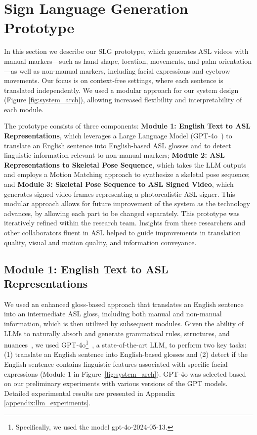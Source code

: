 \section{Sign Language Generation Prototype}\label{sec:design} 

In this section we describe our SLG prototype, which generates ASL videos with manual markers---such as hand shape, location, movements, and palm orientation---as well as non-manual markers, including facial expressions and eyebrow movements. 
Our focus is on context-free settings, where each sentence is translated independently. We used a modular approach for our system design (Figure \ref{fig:system_arch}), allowing increased flexibility and interpretability of each module.

The prototype consists of three components: \textbf{Module 1: English Text to ASL Representations}, which leverages a Large Language Model (GPT-4o~\cite{achiam2023gpt}) to translate an English sentence into English-based ASL glosses and to detect linguistic information relevant to non-manual markers; \textbf{Module 2: ASL Representations to Skeletal Pose Sequence}, which takes the LLM outputs and employs a Motion Matching approach to synthesize a skeletal pose sequence; and \textbf{Module 3: Skeletal Pose Sequence to ASL Signed Video}, which generates signed video frames representing a photorealistic ASL signer. 
This modular approach allows for future improvement of the system as the technology advances, by allowing each part to be changed separately. This prototype was iteratively refined within the research team. Insights from these researchers and other collaborators fluent in ASL helped to guide improvements in translation quality, visual and motion quality, and information conveyance.



\subsection{Module 1: English Text to ASL Representations}\label{sebsec:module1}

We used an enhanced gloss-based approach that translates an English sentence into an intermediate ASL gloss, including both manual and non-manual information, which is then utilized by subsequent modules. Given the ability of LLMs to naturally absorb and generate grammatical rules, structures, and nuances~\cite{brown2020language,radford2019language}, we used GPT-4o\footnote{Specifically, we used the model gpt-4o-2024-05-13.}~\cite{achiam2023gpt}, a state-of-the-art LLM, to perform two key tasks: (1) translate an English sentence into English-based glosses and (2) detect if the English sentence contains linguistic features associated with specific facial expressions (Module 1 in Figure~\ref{fig:system_arch}). GPT-4o was selected based on our preliminary experiments with various versions of the GPT models. Detailed experimental results are presented in Appendix \ref{appendix:llm_experiments}. 

